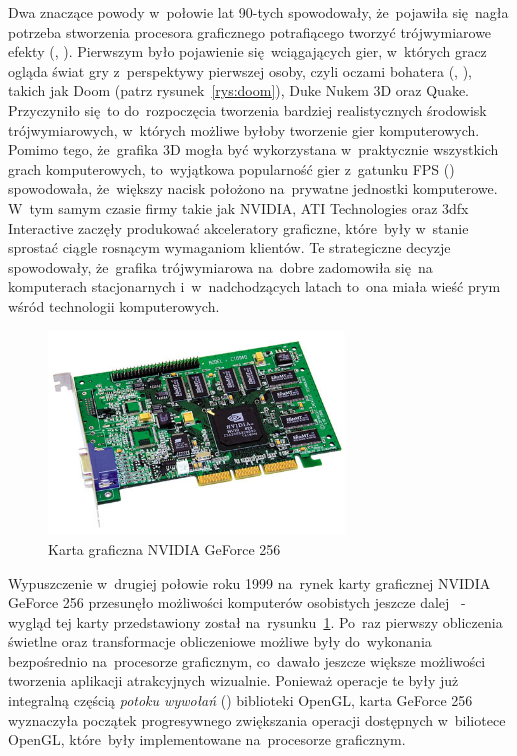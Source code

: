 Dwa znaczące powody w~połowie lat 90-tych spowodowały, że~pojawiła się~nagła potrzeba stworzenia procesora graficznego potrafiącego tworzyć trójwymiarowe efekty (, ). Pierwszym było pojawienie się~wciągających gier, w~których gracz ogląda świat gry z~perspektywy pierwszej osoby, czyli oczami bohatera (, ), takich jak Doom (patrz rysunek~\ref{rys:doom}), Duke Nukem 3D oraz Quake. Przyczyniło się~to do~rozpoczęcia tworzenia bardziej realistycznych środowisk trójwymiarowych, w~których możliwe byłoby tworzenie gier komputerowych. Pomimo tego, że~grafika 3D mogła być wykorzystana w~praktycznie wszystkich grach komputerowych, to~wyjątkowa popularność gier z~gatunku FPS () spowodowała, że~większy nacisk położono na~prywatne jednostki komputerowe. W~tym samym czasie firmy takie jak NVIDIA, ATI Technologies oraz 3dfx Interactive zaczęły produkować akceleratory graficzne, które~były w~stanie sprostać ciągle rosnącym wymaganiom klientów. Te strategiczne decyzje spowodowały, że~grafika trójwymiarowa na~dobre zadomowiła się~na komputerach stacjonarnych i~w~nadchodzących latach to~ona miała wieść prym wśród technologii komputerowych.

\begin{figure}[ht]
\centering\includegraphics[width=0.7\textwidth]{figures/03/geforce-256.jpg}
\caption{Karta graficzna NVIDIA GeForce 256}\label{rys:gf256}
\end{figure}

Wypuszczenie w~drugiej połowie roku 1999 na~rynek karty graficznej NVIDIA GeForce 256 przesunęło możliwości komputerów osobistych jeszcze dalej~\cite{nvidia:geforce256} - wygląd tej karty przedstawiony został na~rysunku~\ref{rys:gf256}. Po~raz pierwszy obliczenia świetlne oraz transformacje obliczeniowe możliwe były do~wykonania bezpośrednio na~procesorze graficznym, co~dawało jeszcze większe możliwości tworzenia aplikacji atrakcyjnych wizualnie. Ponieważ operacje te były już integralną częścią \emph{potoku wywołań} () biblioteki OpenGL, karta GeForce 256 wyznaczyła początek progresywnego zwiększania operacji dostępnych w~biliotece OpenGL, które~były implementowane na~procesorze graficznym.

